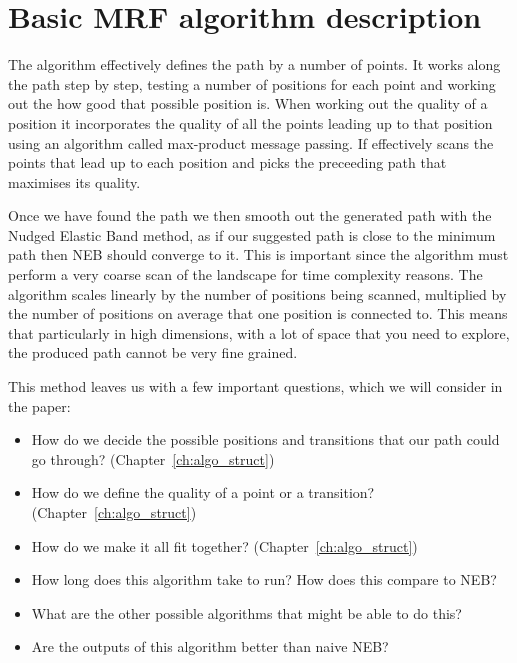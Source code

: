 \section{Basic MRF algorithm description}
\label{sec:basic_algo}
The algorithm effectively defines the path by a number of points.
It works along the path step by step, testing a number of positions for each point and working out the how good that possible position is.
When working out the quality of a position it incorporates the quality of all the points leading up to that position using an algorithm called max-product message passing.
If effectively scans the points that lead up to each position and picks the preceeding path that maximises its quality.

Once we have found the path we then smooth out the generated path with the Nudged Elastic Band method, as if our suggested path is close to the minimum path then NEB should converge to it.
This is important since the algorithm must perform a very coarse scan of the landscape for time complexity reasons.
The algorithm scales linearly by the number of positions being scanned, multiplied by the number of positions on average that one position is connected to.
This means that particularly in high dimensions, with a lot of space that you need to explore, the produced path cannot be very fine grained.

This method leaves us with a few important questions, which we will consider in the paper:
\begin{itemize}
    \item How do we decide the possible positions and transitions that our path could go through? (Chapter~\ref{ch:algo_struct})
    \item How do we define the quality of a point or a transition? (Chapter~\ref{ch:algo_struct})
    \item How do we make it all fit together? (Chapter~\ref{ch:algo_struct})
    \item How long does this algorithm take to run?
    How does this compare to NEB?
    \item What are the other possible algorithms that might be able to do this?
    \item Are the outputs of this algorithm better than naive NEB?
\end{itemize}